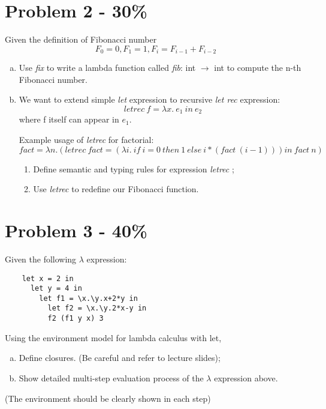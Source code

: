 \documentclass{article}
\newcommand{\answerboxbig}{
    \vspace{20cm} %
}
\begin{document}
\section*{Problem 2 - 30\%}

Given the definition of Fibonacci number
\[F_0 = 0, F_1 = 1, F_i = F_{i-1} + F_{i-2}\]

\begin{enumerate}[(a)]
	\item Use \textit{fix} to write a lambda function called \textit{fib}: int $\rightarrow$ int to compute the n-th Fibonacci number.
	
	\item We want to extend simple \textit{let} expression to recursive \textit{let rec} expression:
	\[letrec\ f = \lambda x.\ e_{1}\ in\ e_{2}\]
	where f itself can appear in $e_{1}$. 
	
	Example usage of \textit{letrec} for factorial:
	\[fact = \lambda n. (letrec\ fact= (\lambda i.\ if\ i=0\ then\ 1\ else\ i*(fact\ (i-1))) in\ fact\ n)\]
	
	\begin{enumerate}[(1)]
		\item Define semantic and typing rules for expression \textit{letrec} ;
		\item Use \textit{letrec} to redefine our Fibonacci function.
	\end{enumerate}
\end{enumerate}

\answerboxbig

\newpage
\section*{Problem 3 - 40\%}

	Given the following $\lambda$ expression:
 
	\begin{verbatim}
	let x = 2 in
	  let y = 4 in
	    let f1 = \x.\y.x+2*y in
	      let f2 = \x.\y.2*x-y in
	      f2 (f1 y x) 3
	\end{verbatim}
	
	Using the environment model for lambda calculus with let,
	
	\begin{enumerate}[(a)]
		\item Define closures. (Be careful and refer to lecture slides);
		 
		\item Show detailed multi-step evaluation process of the $\lambda$ expression above.
	\end{enumerate}
 
	(The environment should be clearly shown in each step)

\answerboxbig
\end{document}
